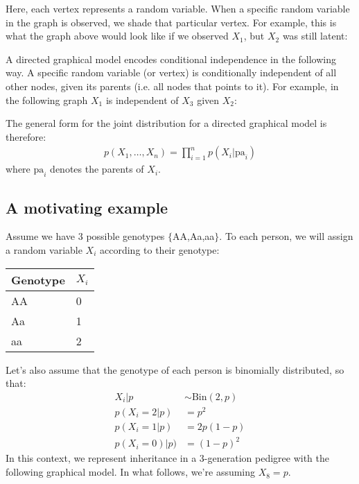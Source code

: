 \documentclass[12pt]{report}
\begin{document}
Here, each vertex represents a random variable. When a specific random
variable in the graph is observed, we shade that particular
vertex. For example, this is what the graph above would look like if
we observed $X_1$, but $X_2$ was still latent:

\begin{center}
\end{center}

A directed graphical model encodes conditional independence in the
following way. A specific random variable (or vertex) is conditionally
independent of all other nodes, given its parents (i.e. all nodes that
points to it). For example, in the following graph $X_1$ is
independent of $X_3$ given $X_2$:

\begin{center}
\end{center}
The general form for the joint distribution for a directed graphical
model is therefore:
\begin{align}
p(X_1,\ldots,X_n) = \prod_{i=1}^n p(X_i |\text{pa}_i) \label{eq:gm_prob}
\end{align}
where $\text{pa}_i$ denotes the parents of $X_i$.
\subsection{A motivating example}
Assume we have 3 possible genotypes $\{$AA,Aa,aa$\}$. To each person, we will assign a
random variable $X_i$ according to their genotype:
\begin{center}
\begin{tabular}{l|l }
  Genotype & $X_i$ \\
  \hline
  AA & 0 \\
  Aa & 1 \\
  aa & 2 
\end{tabular}
\end{center}
Let's also assume that the genotype of each person is binomially
distributed, so that:
\begin{align*}
X_i|p &\sim \text{Bin}(2,p) \\
p(X_i=2|p) &= p^2 \\
p(X_i=1|p) &= 2p(1-p) \\
p(X_i=0)|p) &= (1-p)^2
\end{align*}
In this context, we represent inheritance in a 3-generation
pedigree with the following graphical model. In what follows, we're
assuming $X_8 = p$.
\end{document}
